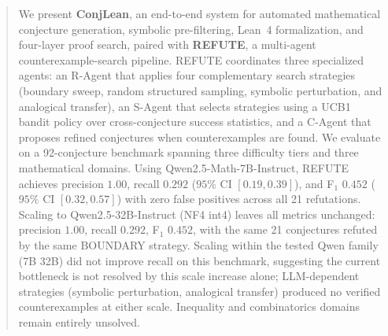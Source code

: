 \begin{abstract}
We present \textbf{ConjLean}, an end-to-end system for automated mathematical
conjecture generation, symbolic pre-filtering, Lean~4 formalization, and
four-layer proof search, paired with \textbf{REFUTE}, a multi-agent
counterexample-search pipeline.
REFUTE coordinates three specialized agents: an R-Agent that applies four
complementary search strategies (boundary sweep, random structured sampling,
symbolic perturbation, and analogical transfer), an S-Agent that selects
strategies using a UCB1 bandit policy over cross-conjecture success statistics,
and a C-Agent that proposes refined conjectures when counterexamples are found.
We evaluate on a 92-conjecture benchmark spanning three difficulty tiers and
three mathematical domains.
Using Qwen2.5-Math-7B-Instruct, REFUTE achieves precision $1.00$,
recall $0.292$ ($95\%$ CI $[0.19, 0.39]$), and
F$_1$ $0.452$ ($95\%$ CI $[0.32, 0.57]$) with zero false positives across
all 21 refutations.
Scaling to Qwen2.5-32B-Instruct (NF4 int4) leaves all metrics unchanged:
precision $1.00$, recall $0.292$, F$_1$ $0.452$, with the same 21 conjectures
refuted by the same BOUNDARY strategy.
Scaling within the tested Qwen family (7B\,\textrightarrow\,32B) did not
improve recall on this benchmark, suggesting the current bottleneck is not
resolved by this scale increase alone; LLM-dependent strategies
(symbolic perturbation, analogical transfer) produced no verified
counterexamples at either scale.
Inequality and combinatorics domains remain entirely unsolved.
\end{abstract}
